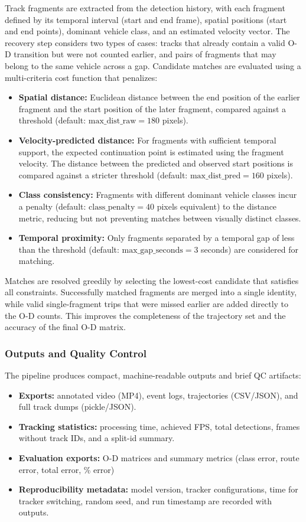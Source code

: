 Track fragments are extracted from the detection history, with each fragment defined by its temporal interval (start and end frame), spatial positions (start and end points), dominant vehicle class, and an estimated velocity vector. The recovery step considers two types of cases: tracks that already contain a valid O-D transition but were not counted earlier, and pairs of fragments that may belong to the same vehicle across a gap. Candidate matches are evaluated using a multi-criteria cost function that penalizes:
\begin{itemize}
    \item \textbf{Spatial distance:} Euclidean distance between the end position of the earlier fragment and the start position of the later fragment, compared against a threshold (default: $\text{max\_dist\_raw} = 180$ pixels).
    \item \textbf{Velocity-predicted distance:} For fragments with sufficient temporal support, the expected continuation point is estimated using the fragment velocity. The distance between the predicted and observed start positions is compared against a stricter threshold (default: $\text{max\_dist\_pred} = 160$ pixels).
    \item \textbf{Class consistency:} Fragments with different dominant vehicle classes incur a penalty (default: $\text{class\_penalty} = 40$ pixels equivalent) to the distance metric, reducing but not preventing matches between visually distinct classes.
    \item \textbf{Temporal proximity:} Only fragments separated by a temporal gap of less than the threshold (default: $\text{max\_gap\_seconds} = 3$ seconds) are considered for matching.
\end{itemize}
Matches are resolved greedily by selecting the lowest-cost candidate that satisfies all constraints. Successfully matched fragments are merged into a single identity, while valid single-fragment trips that were missed earlier are added directly to the O-D counts. This improves the completeness of the trajectory set and the accuracy of the final O-D matrix.

\subsubsection{Outputs and Quality Control}
\label{sec:method_outputs}
The pipeline produces compact, machine-readable outputs and brief QC artifacts:
\begin{itemize}
    \item \textbf{Exports:} annotated video (MP4), event logs, trajectories (CSV/JSON), and full track dumps (pickle/JSON).
    \item \textbf{Tracking statistics:} processing time, achieved FPS, total detections, frames without track IDs, and a split-id summary.
    \item \textbf{Evaluation exports:} O-D matrices and summary metrics (class error, route error, total error, \% error)
    \item \textbf{Reproducibility metadata:} model version, tracker configurations, time for tracker switching, random seed, and run timestamp are recorded with outputs.
\end{itemize}

